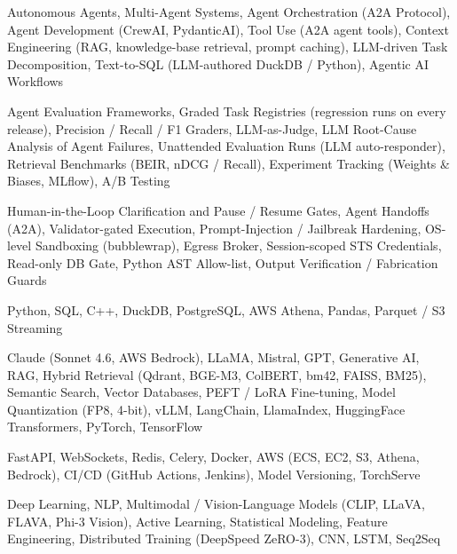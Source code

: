 \documentclass[letter,10pt]{article}
\begin{document}
 Autonomous Agents, Multi-Agent Systems, Agent Orchestration (A2A Protocol), Agent Development (CrewAI, PydanticAI), Tool Use (A2A agent tools), Context Engineering (RAG, knowledge-base retrieval, prompt caching), LLM-driven Task Decomposition, Text-to-SQL (LLM-authored DuckDB / Python), Agentic AI Workflows\par\vspace{2pt}

 Agent Evaluation Frameworks, Graded Task Registries (regression runs on every release), Precision / Recall / F1 Graders, LLM-as-Judge, LLM Root-Cause Analysis of Agent Failures, Unattended Evaluation Runs (LLM auto-responder), Retrieval Benchmarks (BEIR, nDCG / Recall), Experiment Tracking (Weights \& Biases, MLflow), A/B Testing\par\vspace{2pt}

 Human-in-the-Loop Clarification and Pause / Resume Gates, Agent Handoffs (A2A), Validator-gated Execution, Prompt-Injection / Jailbreak Hardening, OS-level Sandboxing (bubblewrap), Egress Broker, Session-scoped STS Credentials, Read-only DB Gate, Python AST Allow-list, Output Verification / Fabrication Guards\par\vspace{2pt}

 Python, SQL, C++, DuckDB, PostgreSQL, AWS Athena, Pandas, Parquet / S3 Streaming\par\vspace{2pt}

 Claude (Sonnet 4.6, AWS Bedrock), LLaMA, Mistral, GPT, Generative AI, RAG, Hybrid Retrieval (Qdrant, BGE-M3, ColBERT, bm42, FAISS, BM25), Semantic Search, Vector Databases, PEFT / LoRA Fine-tuning, Model Quantization (FP8, 4-bit), vLLM, LangChain, LlamaIndex, HuggingFace Transformers, PyTorch, TensorFlow\par\vspace{2pt}

 FastAPI, WebSockets, Redis, Celery, Docker, AWS (ECS, EC2, S3, Athena, Bedrock), CI/CD (GitHub Actions, Jenkins), Model Versioning, TorchServe\par\vspace{2pt}

 Deep Learning, NLP, Multimodal / Vision-Language Models (CLIP, LLaVA, FLAVA, Phi-3 Vision), Active Learning, Statistical Modeling, Feature Engineering, Distributed Training (DeepSpeed ZeRO-3), CNN, LSTM, Seq2Seq
\end{document}
